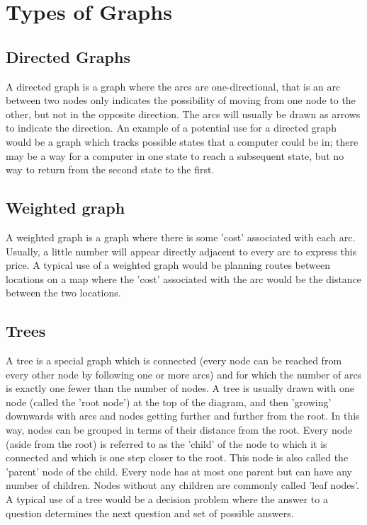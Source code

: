 
\section{Types of Graphs}

\subsection{Directed Graphs}
A directed graph is a graph where the arcs are one-directional, that is an arc between two nodes only indicates the possibility of moving from one node to the other, but not in the opposite direction. The arcs will usually be drawn as arrows to indicate the direction. An example of a potential use for a directed graph would be a graph which tracks possible states that a computer could be in; there may be a way for a computer in one state to reach a subsequent state, but no way to return from the second state to the first.

\subsection{Weighted graph}
A weighted graph is a graph where there is some 'cost' associated with each arc. Usually, a little number will appear directly adjacent to every arc to express this price. A typical use of a weighted graph would be planning routes between locations on a map where the 'cost' associated with the arc would be the distance between the two locations.

\subsection{Trees}
A tree is a special graph which is connected (every node can be reached from every other node by following one or more arcs) and for which the number of arcs is exactly one fewer than the number of nodes. A tree is usually drawn with one node (called the 'root node') at the top of the diagram, and then 'growing' downwards with arcs and nodes getting further and further from the root. In this way, nodes can be grouped in terms of their distance from the root. Every node (aside from the root) is referred to as the 'child' of the node to which it is connected and which is one step closer to the root. This node is also called the 'parent' node of the child. Every node has at most one parent but can have any number of children. Nodes without any children are commonly called 'leaf nodes'. A typical use of a tree would be a decision problem where the answer to a question determines the next question and set of possible answers.
